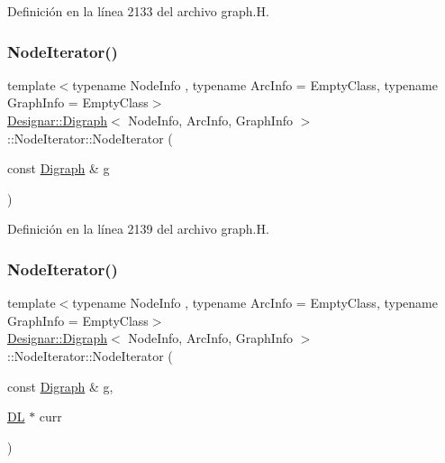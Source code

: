 Definición en la línea 2133 del archivo graph.\+H.

\mbox{\label{class_designar_1_1_digraph_1_1_node_iterator_aa54e560d151fad3a8e36c91dc4006ce4}} 
\subsubsection{\texorpdfstring{Node\+Iterator()}{NodeIterator()}\hspace{0.1cm}{\footnotesize\ttfamily [2/5]}}
{\footnotesize\ttfamily template$<$typename Node\+Info , typename Arc\+Info  = Empty\+Class, typename Graph\+Info  = Empty\+Class$>$ \\
\hyperlink{class_designar_1_1_digraph}{Designar\+::\+Digraph}$<$ Node\+Info, Arc\+Info, Graph\+Info $>$\+::Node\+Iterator\+::\+Node\+Iterator (\begin{DoxyParamCaption}\item[{const \hyperlink{class_designar_1_1_digraph}{Digraph} \&}]{g }\end{DoxyParamCaption})\hspace{0.3cm}{\ttfamily [inline]}}



Definición en la línea 2139 del archivo graph.\+H.

\mbox{\label{class_designar_1_1_digraph_1_1_node_iterator_a2a8d16402a7ec8ac1675cb2729bc4726}} 
\subsubsection{\texorpdfstring{Node\+Iterator()}{NodeIterator()}\hspace{0.1cm}{\footnotesize\ttfamily [3/5]}}
{\footnotesize\ttfamily template$<$typename Node\+Info , typename Arc\+Info  = Empty\+Class, typename Graph\+Info  = Empty\+Class$>$ \\
\hyperlink{class_designar_1_1_digraph}{Designar\+::\+Digraph}$<$ Node\+Info, Arc\+Info, Graph\+Info $>$\+::Node\+Iterator\+::\+Node\+Iterator (\begin{DoxyParamCaption}\item[{const \hyperlink{class_designar_1_1_digraph}{Digraph} \&}]{g,  }\item[{\hyperlink{class_designar_1_1_d_l}{DL} $\ast$}]{curr }\end{DoxyParamCaption})\hspace{0.3cm}{\ttfamily [inline]}}



